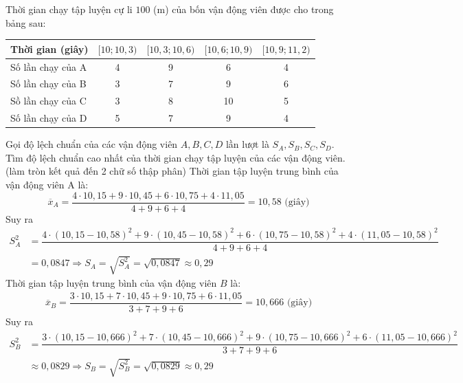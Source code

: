 \begin{bt}%
	Thời gian chạy tập luyện cự li $100$ (m) của bốn vận động viên được cho trong bảng sau:
	\begin{center}
		\begin{tabular}{|l|c|c|c|c|}
			\hline Thời gian (giây) & {$[10 ; 10,3)$} & {$[10,3 ; 10,6)$} & {$[10,6 ; 10,9)$} & {$[10,9 ; 11,2)$} \\
			\hline Số lần chạy của A & 4 & 9 & 6 & 4 \\
			\hline Số lần chạy của B & 3 & 7 & 9 & 6 \\
			\hline Sồ lần chạy của C & 3 & 8 & 10 & 5 \\
			\hline Số lần chạy của D & 5 & 7 & 9 & 4 \\
			\hline
		\end{tabular}
	\end{center}
	Gọi độ lệch chuẩn của các vận động viên $A, B, C, D$ lần lượt là ${S}_{{A}}, {S}_{B}, {S}_{C}, {S}_{{D}}$. Tìm độ lệch chuẩn cao nhất của thời gian chạy tập luyện của các vận động viên. (làm tròn kết quả đến 2 chữ số thập phân)
	\loigiai
	{Thời gian tập luyện trung bình của vận động viên A là:
		$$\overline{{x}}_{A}=\dfrac{4 \cdot 10,15+9 \cdot 10,45+6 \cdot 10,75+4 \cdot 11,05}{4+9+6+4}=10,58 \text{ (giây)}$$
		Suy ra
		\begin{align*}
			{S}_{{A}}^{2}&=\dfrac{4 \cdot(10,15-10,58)^{2}+9 \cdot(10,45-10,58)^{2}+6 \cdot(10,75-10,58)^{2}+4 \cdot(11,05-10,58)^{2}}{4+9+6+4} \\
			&=0,0847 \Rightarrow {S}_{{A}}=\sqrt{{S}_{{A}}^{2}}=\sqrt{0,0847} \approx 0,29
		\end{align*}
		Thời gian tập luyện trung bình của vận động viên $B$ là:
		\begin{align*}
			\overline{{x}}_{B}=\dfrac{3 \cdot 10,15+7 \cdot 10,45+9 \cdot 10,75+6 \cdot 11,05}{3+7+9+6}=10,666 \text{ (giây)}
		\end{align*}
		Suy ra
		\begin{align*}
			{S}_{{B}}^{2} & =\dfrac{3 \cdot(10,15-10,666)^{2}+7 \cdot(10,45-10,666)^{2}+9 \cdot(10,75-10,666)^{2}+6 \cdot(11,05-10,666)^{2}}{3+7+9+6} \\
			& \approx 0,0829 \Rightarrow {S}_{{B}}=\sqrt{{S}_{{B}}^{2}}=\sqrt{0,0829} \approx 0,29

\end{align*}}
\end{bt}

